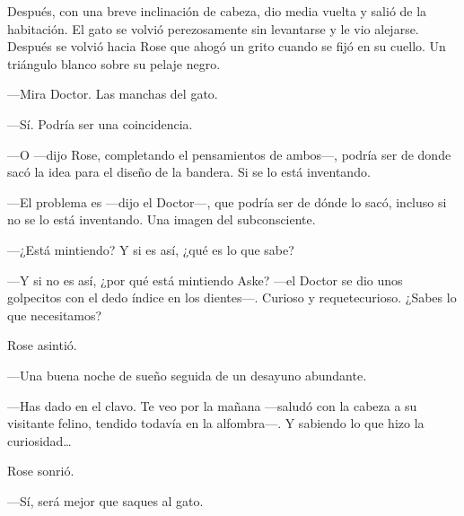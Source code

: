 {Después, con una breve inclinación de cabeza, dio media vuelta y salió
	de la habitación. El gato se volvió perezosamente sin levantarse y le
	vio alejarse. Después se volvió hacia Rose que ahogó un grito cuando se
fijó en su cuello. Un triángulo blanco sobre su pelaje negro.}

{---Mira Doctor. Las manchas del gato.}

{---Sí. Podría ser una coincidencia.}

{---O ---dijo Rose, completando el pensamientos de ambos---, podría ser
	de donde sacó la idea para el diseño de la bandera. Si se lo está
inventando.}

{---El problema es ---dijo el Doctor---, que podría ser de dónde lo
	sacó, incluso si no se lo está inventando. Una imagen del
subconsciente.}

{---¿Está mintiendo? Y si es así, ¿qué es lo que sabe?}

{---Y si no es así, ¿por qué está mintiendo Aske? ---el Doctor se dio
	unos golpecitos con el dedo índice en los dientes---. Curioso y
requetecurioso. ¿Sabes lo que necesitamos?}

{Rose asintió.}

{---Una buena noche de sueño seguida de un desayuno abundante.}

{---Has dado en el clavo. Te veo por la mañana ---saludó con la cabeza a
	su visitante felino, tendido todavía en la alfombra---. Y sabiendo lo
	que hizo la curiosidad\ldots{}}

{Rose sonrió.}

{---Sí, será mejor que saques al gato.}

